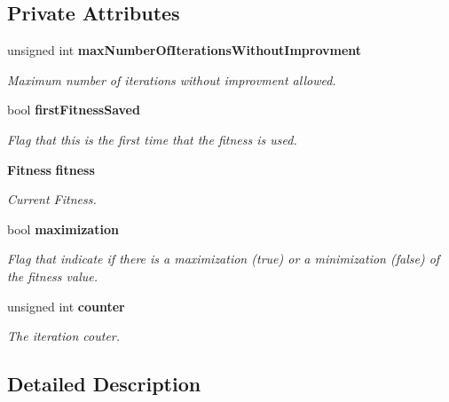 \subsection*{Private Attributes}
\begin{CompactItemize}
\item 
unsigned int {\bf maxNumberOfIterationsWithoutImprovment}\label{classmo_no_fit_impr_sol_continue_9dbd725a2dab787f9f7b159b759e4834}

\begin{CompactList}\small\item\em Maximum number of iterations without improvment allowed. \item\end{CompactList}\item 
bool {\bf firstFitnessSaved}\label{classmo_no_fit_impr_sol_continue_ca3591e47a075b59e0826f31234c71ef}

\begin{CompactList}\small\item\em Flag that this is the first time that the fitness is used. \item\end{CompactList}\item 
{\bf Fitness} {\bf fitness}\label{classmo_no_fit_impr_sol_continue_3d3d2b43a4dd73e38689cc0018d44ee7}

\begin{CompactList}\small\item\em Current Fitness. \item\end{CompactList}\item 
bool {\bf maximization}
\begin{CompactList}\small\item\em Flag that indicate if there is a maximization (true) or a minimization (false) of the fitness value. \item\end{CompactList}\item 
unsigned int {\bf counter}\label{classmo_no_fit_impr_sol_continue_46fc008a8f7cd06dcaaeb4016b433adb}

\begin{CompactList}\small\item\em The iteration couter. \item\end{CompactList}\end{CompactItemize}


\subsection{Detailed Description}
